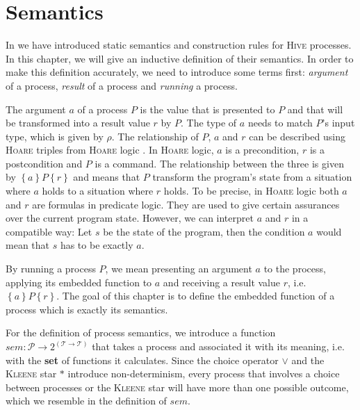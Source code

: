 \section{Semantics}
\label{chp:semantics}
In  we have introduced static semantics and construction rules for \textsc{Hive} processes. In this chapter, we will give an inductive definition of their semantics. In order to make this definition accurately, we need to introduce some terms first: \textit{argument} of a process, \textit{result} of a process and \textit{running} a process.

The argument $a$ of a process $P$ is the value that is presented to $P$ and that will be transformed into a result value $r$ by $P$. The type of $a$ needs to match $P$'s input type, which is given by $\rho$. The relationship of $P$, $a$ and $r$ can be described using \textsc{Hoare} triples from \textsc{Hoare} logic \cite{}. In \textsc{Hoare} logic, $a$ is a precondition, $r$ is a postcondition and $P$ is a command. The relationship between the three is given by $\left\{ a \right\} P \left\{ r \right\}$ and means that $P$ transform the program's state from a situation where $a$ holds to a situation where $r$ holds. To be precise, in \textsc{Hoare} logic both $a$ and $r$ are formulas in predicate logic. They are used to give certain assurances over the current program state. However, we can interpret $a$ and $r$ in a compatible way: Let $s$ be the state of the program, then the condition $a$ would mean that $s$ has to be exactly $a$.

By running a process $P$, we mean presenting an argument $a$ to the process, applying its embedded function to $a$ and receiving a result value $r$, i.e. $\left\{ a \right\} P \left\{ r \right\}$. The goal of this chapter is to define the embedded function of a process which is exactly its semantics.

For the definition of process semantics, we introduce a function $sem \colon \mathcal{P} \to 2^{\left( \mathcal{T} \to \mathcal{T} \right)}$ that takes a process and associated it with its meaning, i.e. with the \textbf{set} of functions it calculates. Since the choice operator $\vee$ and the \textsc{Kleene} star $*$ introduce non-determinism, every process that involves a choice between processes or the \textsc{Kleene} star will have more than one possible outcome, which we resemble in the definition of $sem$.



